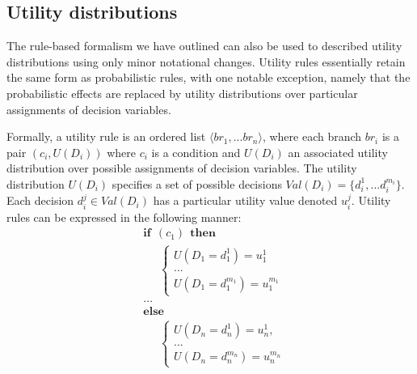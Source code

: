 
\subsection{Utility distributions}

The rule-based formalism we have outlined can also be used to described utility distributions using only minor notational changes. Utility rules essentially retain the same form as probabilistic rules, with one notable exception, namely that the probabilistic effects are replaced by utility distributions over particular assignments of decision variables. 

Formally, a utility rule is an ordered list $\langle br_1, ... br_n\rangle$, where each branch $br_i$ is a pair $(c_i, U(D_i))$ where $c_i$ is a condition and $U(D_i)$ an associated utility distribution over possible assignments of decision variables. The utility distribution $U(D_i)$ specifies a set of possible decisions  $Val(D_i) = \{d_i^1,... d_i^{m_i}\}$.  Each decision $d_i^j \in Val(D_i)$ has a particular utility value denoted $u_i^j$.  Utility rules can be expressed in the following manner:
\begin{equation}
\begin{aligned}
& \textbf{if} \ \ (c_{1}) \ \ \textbf{then} \\ 
& \;\;\;\;\; \begin{cases}
U(D_1\!=\!d_1^1) = u_1^1 \\
 ... \\
U(D_1\!=\!d_1^{m_1}) = u_1^{m_1} 
\end{cases} \\
& ...  \\
& \textbf{else} \\
& \;\;\;\;\; \begin{cases}
U(D_n\!=\!d_n^1) = u_n^1, \\
... \\
U(D_n\!=\!d_n^{m_n}) = u_n^{m_n}
\end{cases}
\end{aligned}
\end{equation}


